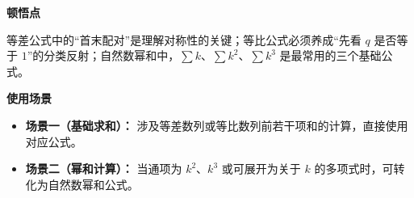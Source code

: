 \begin{explanationbox}
	\medskip
	\textbf{\textcolor{CExplanation}{顿悟点}}

	等差公式中的“首末配对”是理解对称性的关键；等比公式必须养成“先看 \(q\) 是否等于 \(1\)”的分类反射；自然数幂和中，\(\sum k\)、\(\sum k^2\)、\(\sum k^3\) 是最常用的三个基础公式。

	\medskip
	\textbf{\textcolor{CExplanation}{使用场景}}
	\begin{itemize}[leftmargin=*, itemsep=0.5em, topsep=0.4em]
		\item \textbf{场景一（基础求和）：} 涉及等差数列或等比数列前若干项和的计算，直接使用对应公式。
		\item \textbf{场景二（幂和计算）：} 当通项为 \(k^2\)、\(k^3\) 或可展开为关于 \(k\) 的多项式时，可转化为自然数幂和公式。
	\end{itemize}
\end{explanationbox}